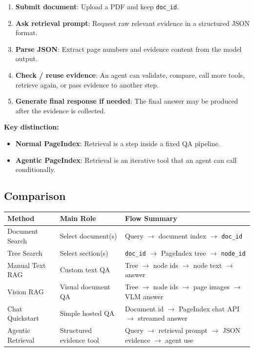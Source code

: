 \documentclass[11pt,a4paper]{article}
\newcommand{\fieldname}[1]{\textcolor{red!70!black}{\texttt{#1}}}
\begin{document}
\begin{enumerate}
    \item \textbf{Submit document}: Upload a PDF and keep \fieldname{doc\_id}.
    \item \textbf{Ask retrieval prompt}: Request raw relevant evidence in a structured JSON format.
    \item \textbf{Parse JSON}: Extract page numbers and evidence content from the model output.
    \item \textbf{Check / reuse evidence}: An agent can validate, compare, call more tools, retrieve again, or pass evidence to another step.
    \item \textbf{Generate final response if needed}: The final answer may be produced after the evidence is collected.
\end{enumerate}

\noindent\textbf{Key distinction:}
\begin{itemize}
    \item \textbf{Normal PageIndex}: Retrieval is a step inside a fixed QA pipeline.
    \item \textbf{Agentic PageIndex}: Retrieval is an iterative tool that an agent can call conditionally.
\end{itemize}

\subsection{Comparison}

\begin{tabularx}{\textwidth}{@{}p{}p{}p{}@{}}
\toprule
\textbf{Method} & \textbf{Main Role} & \textbf{Flow Summary} \\
\midrule
Document Search & Select document(s) & Query $\rightarrow$ document index $\rightarrow$ \fieldname{doc\_id} \\
Tree Search & Select section(s) & \fieldname{doc\_id} $\rightarrow$ PageIndex tree $\rightarrow$ \fieldname{node\_id} \\
Manual Text RAG & Custom text QA & Tree $\rightarrow$ node ids $\rightarrow$ node text $\rightarrow$ answer \\
Vision RAG & Visual document QA & Tree $\rightarrow$ node ids $\rightarrow$ page images $\rightarrow$ VLM answer \\
Chat Quickstart & Simple hosted QA & Document id $\rightarrow$ PageIndex chat API $\rightarrow$ streamed answer \\
Agentic Retrieval & Structured evidence tool & Query $\rightarrow$ retrieval prompt $\rightarrow$ JSON evidence $\rightarrow$ agent use \\
\bottomrule
\end{tabularx}
\end{document}
